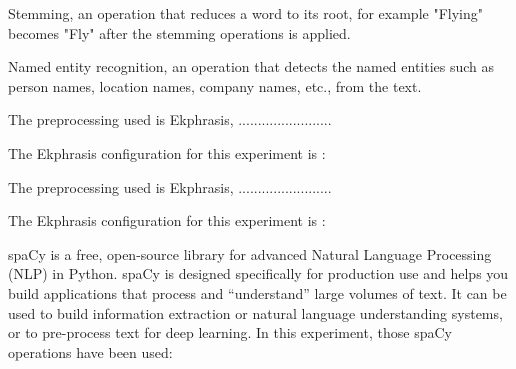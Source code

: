 \documentclass[12pt, a4paper]{article}
\begin{document}
Stemming, an operation that reduces a word to its root, for example "Flying" becomes "Fly" after the stemming operations is applied.


Named entity recognition, an operation that detects the named entities such as person names, location names, company names, etc., from the text.
\hfill\break

\hfill\break



The preprocessing used is Ekphrasis, ........................

\hfill\break
The Ekphrasis configuration for this experiment is :


The preprocessing used is Ekphrasis, ........................

\hfill\break
The Ekphrasis configuration for this experiment is :



spaCy is a free, open-source library for advanced Natural Language Processing (NLP) in Python.
spaCy is designed specifically for production use and helps you build applications that process and “understand”
large volumes of text. It can be used to build information extraction or natural language understanding systems,
or to pre-process text for deep learning.
In this experiment, those spaCy operations have been used:
\end{document}
